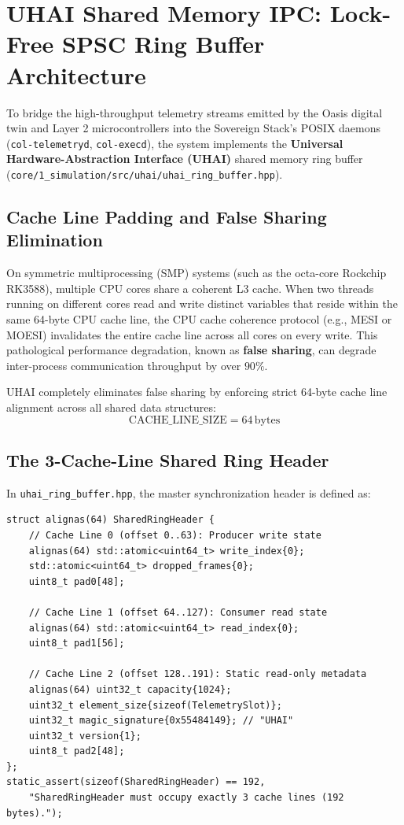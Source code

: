 \section{UHAI Shared Memory IPC: Lock-Free SPSC Ring Buffer Architecture}

To bridge the high-throughput telemetry streams emitted by the Oasis digital twin and Layer 2 microcontrollers into the Sovereign Stack's POSIX daemons (\texttt{col-telemetryd}, \texttt{col-execd}), the system implements the \textbf{Universal Hardware-Abstraction Interface (UHAI)} shared memory ring buffer (\texttt{core/1\_simulation/src/uhai/uhai\_ring\_buffer.hpp}).

\subsection{Cache Line Padding and False Sharing Elimination}

On symmetric multiprocessing (SMP) systems (such as the octa-core Rockchip RK3588), multiple CPU cores share a coherent L3 cache. When two threads running on different cores read and write distinct variables that reside within the same 64-byte CPU cache line, the CPU cache coherence protocol (e.g., MESI or MOESI) invalidates the entire cache line across all cores on every write. This pathological performance degradation, known as \textbf{false sharing}, can degrade inter-process communication throughput by over $90\%$.

UHAI completely eliminates false sharing by enforcing strict 64-byte cache line alignment across all shared data structures:
\begin{equation}
\mathrm{CACHE\_LINE\_SIZE} = 64\,\mathrm{bytes}
\label{eq:cache_line_size}
\end{equation}

\subsection{The 3-Cache-Line Shared Ring Header}

In \texttt{uhai\_ring\_buffer.hpp}, the master synchronization header is defined as:
\begin{verbatim}
struct alignas(64) SharedRingHeader {
    // Cache Line 0 (offset 0..63): Producer write state
    alignas(64) std::atomic<uint64_t> write_index{0};
    std::atomic<uint64_t> dropped_frames{0};
    uint8_t pad0[48];

    // Cache Line 1 (offset 64..127): Consumer read state
    alignas(64) std::atomic<uint64_t> read_index{0};
    uint8_t pad1[56];

    // Cache Line 2 (offset 128..191): Static read-only metadata
    alignas(64) uint32_t capacity{1024};
    uint32_t element_size{sizeof(TelemetrySlot)};
    uint32_t magic_signature{0x55484149}; // "UHAI"
    uint32_t version{1};
    uint8_t pad2[48];
};
static_assert(sizeof(SharedRingHeader) == 192, 
    "SharedRingHeader must occupy exactly 3 cache lines (192 bytes).");
\end{verbatim}

